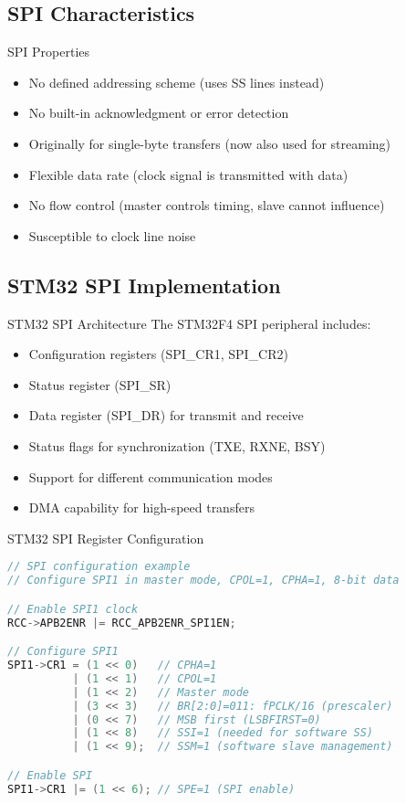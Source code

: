 \subsection{SPI Characteristics}

\begin{definition}{SPI Properties}
\begin{itemize}
    \item No defined addressing scheme (uses SS lines instead)
    \item No built-in acknowledgment or error detection
    \item Originally for single-byte transfers (now also used for streaming)
    \item Flexible data rate (clock signal is transmitted with data)
    \item No flow control (master controls timing, slave cannot influence)
    \item Susceptible to clock line noise
\end{itemize}
\end{definition}

\columnbreak

\subsection{STM32 SPI Implementation}

\begin{concept}{STM32 SPI Architecture}
The STM32F4 SPI peripheral includes:
\begin{itemize}
    \item Configuration registers (SPI\_CR1, SPI\_CR2)
    \item Status register (SPI\_SR)
    \item Data register (SPI\_DR) for transmit and receive
    \item Status flags for synchronization (TXE, RXNE, BSY)
    \item Support for different communication modes
    \item DMA capability for high-speed transfers
\end{itemize}
\end{concept}

\begin{code}{STM32 SPI Register Configuration}
\begin{lstlisting}[language=C, style=basesmol]
// SPI configuration example
// Configure SPI1 in master mode, CPOL=1, CPHA=1, 8-bit data

// Enable SPI1 clock
RCC->APB2ENR |= RCC_APB2ENR_SPI1EN;

// Configure SPI1
SPI1->CR1 = (1 << 0)   // CPHA=1
          | (1 << 1)   // CPOL=1
          | (1 << 2)   // Master mode
          | (3 << 3)   // BR[2:0]=011: fPCLK/16 (prescaler)
          | (0 << 7)   // MSB first (LSBFIRST=0)
          | (1 << 8)   // SSI=1 (needed for software SS)
          | (1 << 9);  // SSM=1 (software slave management)

// Enable SPI
SPI1->CR1 |= (1 << 6); // SPE=1 (SPI enable)
\end{lstlisting}
\end{code}

